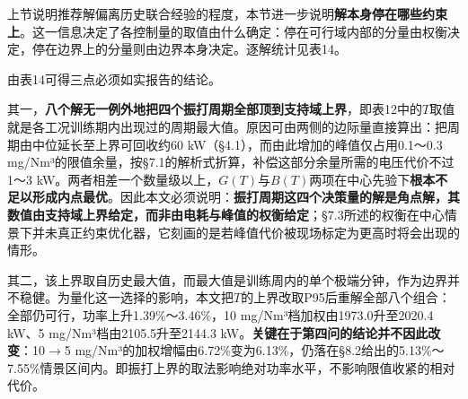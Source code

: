 \documentclass[UTF8,zihao=5,a4paper]{ctexart}
\begin{document}
上节说明推荐解偏离历史联合经验的程度，本节进一步说明\textbf{解本身停在哪些约束上}。这一信息决定了各控制量的取值由什么确定：停在可行域内部的分量由权衡决定，停在边界上的分量则由边界本身决定。逐解统计见表14。


\begin{table}[htbp]
\centering
\caption*{\normalsize 表14　最优解的活跃约束与振打周期上界的敏感性}
\vspace{-2pt}
\end{table}

由表14可得三点必须如实报告的结论。

其一，\textbf{八个解无一例外地把四个振打周期全部顶到支持域上界}，即表12中的$T$取值就是各工况训练期内出现过的周期最大值。原因可由两侧的边际量直接算出：把周期由中位延长至上界可回收约60 kW（§4.1），而由此增加的峰值仅占用0.1～0.3 mg/Nm³的限值余量，按§7.1的解析式折算，补偿这部分余量所需的电压代价不过1～3 kW。两者相差一个数量级以上，$G(T)$与$B(T)$两项在中心先验下\textbf{根本不足以形成内点最优}。因此本文必须说明：\textbf{振打周期这四个决策量的解是角点解，其数值由支持域上界给定，而非由电耗与峰值的权衡给定}；§7.3所述的权衡在中心情景下并未真正约束优化器，它刻画的是若峰值代价被现场标定为更高时将会出现的情形。

其二，该上界取自历史最大值，而最大值是训练周内的单个极端分钟，作为边界并不稳健。为量化这一选择的影响，本文把$T$的上界改取P95后重解全部八个组合：全部仍可行，功率上升1.39\%～3.46\%，10 mg/Nm³档加权由1973.0升至2020.4 kW、5 mg/Nm³档由2105.5升至2144.3 kW。\textbf{关键在于第四问的结论并不因此改变}：10$\rightarrow$5 mg/Nm³的加权增幅由6.72\%变为6.13\%，仍落在§8.2给出的5.13\%～7.55\%情景区间内。即振打上界的取法影响绝对功率水平，不影响限值收紧的相对代价。
\end{document}
